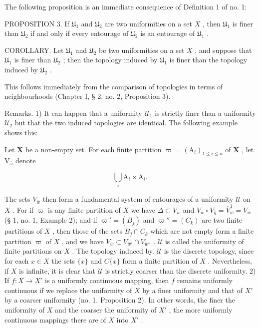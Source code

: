 The following proposition is an immediate consequence of Definition 1 of no. 1:

PROPOSITION 3. If \(\mathfrak{U}_1\) and \(\mathfrak{U}_2\) are two uniformities on a set \(X\) , then \(\mathfrak{U}_1\) is finer than \(\mathfrak{U}_2\) if and only if every entourage of \(\mathfrak{U}_2\) is an entourage of \(\mathfrak{U}_1\) .

COROLLARY. Let \(\mathfrak{U}_1\) and \(\mathfrak{U}_2\) be two uniformities on a set \(X\) , and suppose that \(\mathfrak{U}_1\) is finer than \(\mathfrak{U}_2\) ; then the topology induced by \(\mathfrak{U}_1\) is finer than the topology induced by \(\mathfrak{U}_2\) .

This follows immediately from the comparison of topologies in terms of neighbourhoods (Chapter I, § 2, no. 2, Proposition 3).

Remarks. 1) It can happen that a uniformity \(\mathcal{U}_1\) is strictly finer than a uniformity \(\mathcal{U}_2\) but that the two induced topologies are identical. The following example shows this:

Let \(\mathbf{X}\) be a non-empty set. For each finite partition \(\varpi = (\mathrm{A}_i)_{1\leqslant i\leqslant n}\) of \(\mathbf{X}\) , let \(\mathrm{V}_{\overline{\omega}}\) denote

\[
\bigcup_ {i} \mathrm{A} _ {i} \times \mathrm{A} _ {i}.
\]

The sets \(V_{\overline{w}}\) then form a fundamental system of entourages of a uniformity \(\mathcal{U}\) on \(X\) . For if \(\varpi\) is any finite partition of \(X\) we have \(\Delta \subset V_{\overline{w}}\) and \(V_{\overline{w}} \circ V_{\overline{g}} = \overline{V}_{\overline{w}}^{1} = V_{\overline{w}}\) (§ 1, no. 1, Example 2); and if \(\varpi' = (B_j)\) and \(\varpi'' = (C_k)\) are two finite partitions of \(X\) , then those of the sets \(B_j \cap C_k\) which are not empty form a finite partition \(\varpi\) of \(X\) , and we have \(V_{\overline{w}} \subset V_{\overline{w}'} \cap V_{\overline{w}''}\) . \(\mathcal{U}\) is called the uniformity of finite partitions on \(X\) . The topology induced by. \(\mathcal{U}\) is the discrete topology, since for each \(x \in X\) the sets \(\{x\}\) and \(C\{x\}\) form a finite partition of \(X\) . Nevertheless, if \(X\) is infinite, it is clear that \(\mathcal{U}\) is strictly coarser than the discrete uniformity. 2) If \(f: X \to X'\) is a uniformly continuous mapping, then \(f\) remains uniformly continuous if we replace the uniformity of \(X\) by a finer uniformity and that of \(X'\) by a coarser uniformity (no. 1, Proposition 2). In other words, the finer the uniformity of \(X\) and the coarser the uniformity of \(X'\) , the more uniformly continuous mappings there are of \(X\) into \(X'\) .

